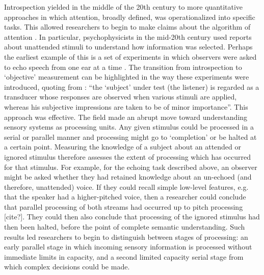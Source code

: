 Introspection yielded in the middle of the 20th century to more quantitative approaches in which attention, broadly defined, was operationalized into specific tasks. This allowed researchers to begin to make claims about the algorithm of attention \citep{Marr1982-fg}. In particular, psychophysicists in the mid-20th century used reports about unattended stimuli to understand how information was selected. Perhaps the earliest example of this is a set of experiments in which observers were asked to echo speech from one ear at a time \citep{Cherry1953-as}. The transition from introspection to ‘objective’ measurement can be highlighted in the way these experiments were introduced, quoting from \citet{Cherry1953-as}: ``the `subject' under test (the listener) is regarded as a transducer whose responses are observed when various stimuli are applied, whereas his subjective impressions are taken to be of minor importance''. This approach was effective. The field made an abrupt move toward understanding sensory systems as processing units. Any given stimulus could be processed in a serial or parallel manner and processing might go to `completion' or be halted at a certain point. Measuring the knowledge of a subject about an attended or ignored stimulus therefore assesses the extent of processing which has occurred for that stimulus. For example, for the echoing task described above, an observer might be asked whether they had retained knowledge about an un-echoed (and therefore, unattended) voice. If they could recall simple low-level features, e.g. that the speaker had a higher-pitched voice, then a researcher could conclude that parallel processing of both streams had occurred up to pitch processing [cite?]. They could then also conclude that processing of the ignored stimulus had then been halted, before the point of complete semantic understanding. Such results led researchers to begin to distinguish between stages of processing: an early parallel stage in which incoming sensory information is processed without immediate limits in capacity, and a second limited capacity serial stage from which complex decisions could be made.


